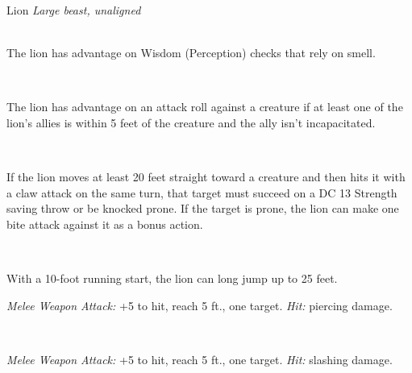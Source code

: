 \documentclass[10pt,twoside,twocolumn,openany]{book}
\begin{document}
\begin{monsterboxnobg}{Lion}
	\textit{Large beast, unaligned}\\
	\hline
	\basics[
		armorclass	= 12,
		hitpoints		= \dice{4d10 + 4},
		speed		= {50 ft.}
	]
	\hline
	\stats[
		STR	= \stat{17},
		DEX	= \stat{15},
		CON	= \stat{13},
		INT	= \stat{3},
		WIS	= \stat{12},
		CHA	= \stat{8}
	]
	\hline
	\details[
		skills			= {Perception +3, Stealth +6},
		senses		= {passive Perception 13},
		languages		= {-},
		challenge		= 1
	]
	\hline \\[1mm]
	\begin{monsteraction}
		The lion has advantage on Wisdom (Perception) checks that rely on smell.
	\end{monsteraction}\\
	\begin{monsteraction}[PackTactics.]
		The lion has advantage on an attack roll against a creature if at least one of the lion's allies is within 5 feet of the creature and the ally isn't incapacitated.
	\end{monsteraction}\\
	\begin{monsteraction}[Pounce]
		If the lion moves at least 20 feet straight toward a creature and then hits it with a claw attack on the same turn, that target must succeed on a DC 13 Strength saving throw or be knocked prone. If the target is prone, the lion can make one bite attack against it as a bonus action.
	\end{monsteraction}\\
	\begin{monsteraction}
		With a 10-foot running start, the lion can long jump up to 25 feet.
	\end{monsteraction}
	\begin{monsteraction}[Bite]
		\textit{Melee Weapon Attack:} +5 to hit, reach 5 ft., one target. \textit{Hit:}  piercing damage.
	\end{monsteraction}\\
	\begin{monsteraction}[Claw]
		\textit{Melee Weapon Attack:} +5 to hit, reach 5 ft., one target. \textit{Hit:}  slashing damage.
	\end{monsteraction}
\end{monsterboxnobg}
\end{document}
